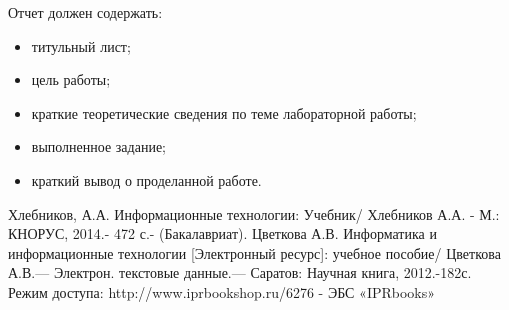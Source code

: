 \documentclass[a4paper]{article}
\begin{document}
\noindent Отчет должен содержать:
\begin{itemize}
        \item титульный лист;
        \item цель работы;
        \item краткие теоретические сведения по теме лабораторной работы;
        \item выполненное задание;
        \item краткий вывод о проделанной работе.
\end{itemize}

\begin{thebibliography}{3}
    Хлебников, А.А. Информационные технологии: Учебник/ Хлебников А.А. - М.: КНОРУС, 2014.- 472 с.- (Бакалавриат).
Цветкова А.В. Информатика и информационные технологии [Электронный ресурс]: учебное пособие/ Цветкова А.В.— Электрон. текстовые данные.— Саратов: Научная книга, 2012.-182с. Режим доступа: http://www.iprbookshop.ru/6276 - ЭБС «IPRbooks»

\end{thebibliography}
\end{document}
